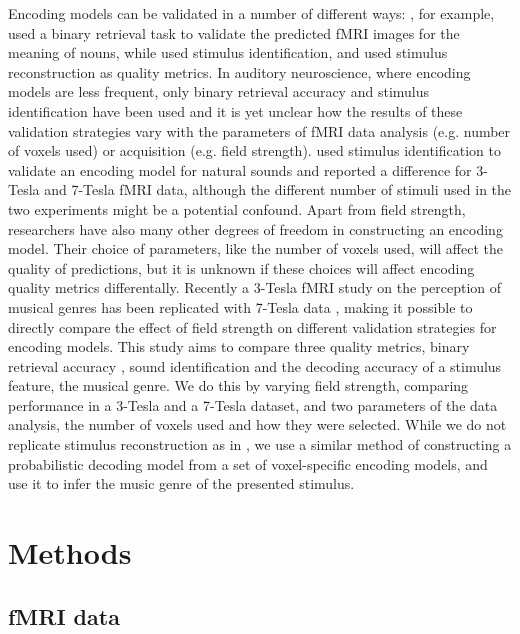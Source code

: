 Encoding models can be validated in a number of different ways: \citet{ML08},
for example, used a binary retrieval task to validate the predicted f{MRI}
images for the meaning of nouns, while \citet{KG+08} used stimulus
identification, and \citet{NG09} used stimulus reconstruction
as quality metrics.  In auditory neuroscience, where encoding models are less
frequent, only binary retrieval accuracy \citep{CTK+2012} and stimulus
identification \citep{SF14} have been used and it is yet unclear how the
results of these validation strategies vary with the parameters of f{MRI} data
analysis (e.g. number of voxels used)  or acquisition (e.g. field strength).
\citet{SF14} used stimulus identification to validate an encoding model for
natural sounds and reported a difference for 3-Tesla and 7-Tesla f{MRI} data,
although the different number of stimuli used in the two experiments might be a
potential confound.  Apart from field strength, researchers have also many
other degrees of freedom in constructing an encoding model.  Their choice of
parameters, like the number of voxels used, will affect the quality of
predictions, but it is unknown if these choices will affect encoding quality
metrics differentally.  Recently a 3-Tesla f{MRI} study on the perception of
musical genres \citep{CTK+2012} has been replicated with 7-Tesla data
\citep{HDH+2015}, making it possible to directly compare the effect of field
strength on different validation strategies for encoding models.  This study
aims to compare three quality metrics, binary retrieval accuracy \citep{ML08},
sound identification \citep{KG+08,SF14} and the decoding accuracy of a stimulus
feature, the musical genre. We do this by varying field strength, comparing
performance in a 3-Tesla and a 7-Tesla dataset, and two parameters of the data
analysis, the number of voxels used and how they were selected.  While we do
not replicate stimulus reconstruction as in \citep{NG09}, we use a similar
method of constructing a probabilistic decoding model from a set of
voxel-specific encoding models, and use it to infer the music genre of the
presented stimulus.


\section*{Methods}

\subsection*{fMRI data}

